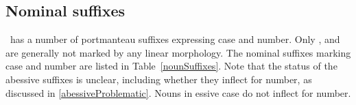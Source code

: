 \subsection{Nominal suffixes}\label{nominalSuffixes}
\PS\ has a number of portmanteau suffixes expressing case and number. 
Only ,  and  are generally %
not marked by any linear morphology. %
The nominal suffixes marking case and number are listed in Table~\vref{nounSuffixes}. Note that the status of the abessive suffixes is unclear, including whether they inflect for number, as discussed in \SEC\ref{abessiveProblematic}. Nouns in essive case do not inflect for number.

